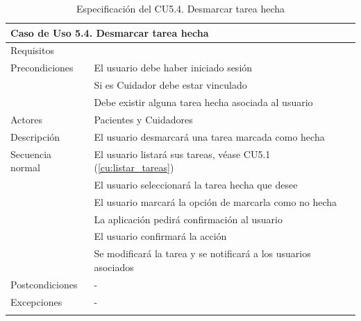 \begin{longtable}{|p{} p{}|}
    \hline
    \multicolumn{2}{|l|}{\textbf{Caso de Uso 5.4. Desmarcar tarea hecha}} \\ \hline \hline
    Requisitos          & {req:marcar_tarea_no_hecha} \\ \hline
    Precondiciones      & El usuario debe haber iniciado sesión \\
                        & Si es Cuidador debe estar vinculado \\ 
                        & Debe existir alguna tarea hecha asociada al usuario \\ \hline
    Actores             & Pacientes y Cuidadores \\ \hline
    Descripción         & El usuario desmarcará una tarea marcada como hecha \\ \hline
    Secuencia normal    & El usuario listará sus tareas, véase CU5.1 (\ref{cu:listar_tareas}) \\
                        & El usuario seleccionará la tarea hecha que desee \\
                        & El usuario marcará la opción de marcarla como no hecha \\
                        & La aplicación pedirá confirmación al usuario \\
                        & El usuario confirmará la acción \\
                        & Se modificará la tarea y se notificará a los usuarios asociados \\ \hline
    Postcondiciones     & - \\ \hline
    Excepciones         & - \\ \hline
    \caption{Especificación del CU5.4. Desmarcar tarea hecha}
    \label{cu:desmarcar_tarea}
\end{longtable}

